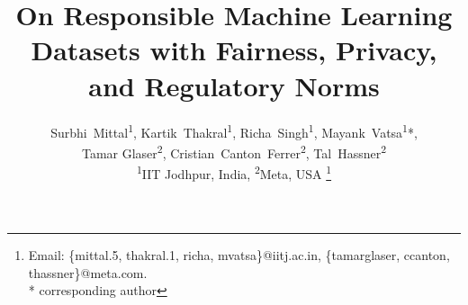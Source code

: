 \documentclass[journal]{IEEEtran}
\begin{document}
%
\title{On Responsible Machine Learning Datasets with Fairness, Privacy, and Regulatory Norms}
%
%
%


% 

\author{Surbhi~Mittal\textsuperscript{1}, Kartik~Thakral\textsuperscript{1}, Richa~Singh\textsuperscript{1}, Mayank~Vatsa\textsuperscript{1}*, \\ Tamar Glaser\textsuperscript{2}, Cristian~Canton~Ferrer\textsuperscript{2}, Tal~Hassner\textsuperscript{2} \protect\\
\textsuperscript{1}IIT Jodhpur, India,   \textsuperscript{2}Meta, USA%
\thanks{
Email: \{mittal.5, thakral.1,  richa, mvatsa\}@iitj.ac.in,  \{tamarglaser, ccanton, thassner\}@meta.com.\protect \\ * corresponding author
}}
\end{document}
